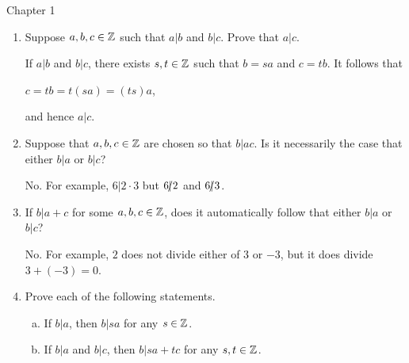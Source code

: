 \documentclass[11pt,fleqn,dvipsnames,usenames]{article}
\renewcommand{\headrulewidth}{1pt}
\begin{document}
\fancyhead[L]{\course}
\fancyhead[R]{\term}
\renewcommand{\headrulewidth}{0.4pt}

{\huge Chapter 1}
\vsp

\begin{enumerate}
\item Suppose $a,b,c\in\mathbb{Z}$ such that $a|b$ and $b|c$.  Prove that $a|c$.
\vsp

\solution If $a|b$ and $b|c$, there exists $s,t\in\mathbb{Z}$ such that $b = sa$ and $c = tb$.  It follows that
\begin{center}
$c = tb = t(sa) = (ts)a$,
\end{center}
and hence $a|c$.

\item Suppose that $a,b,c\in\mathbb{Z}$ are chosen so that $b|ac$.  Is it necessarily the case that either $b|a$ or $b|c$?
\vsp

\solution No.  For example, $6|2\cdot 3$ but $6|\kern-0.9ex{/} 2$ and $6|\kern-0.9ex{/} 3$.

\item If $b|a+c$ for some $a,b,c\in \mathbb{Z}$, does it automatically follow that either $b|a$ or $b|c$?
\vsp

\solution No.  For example, $2$ does not divide either of $3$ or $-3$, but it does divide $3 + (-3) = 0$.
\vsp

\item Prove each of the following statements.
\begin{enumerate}[(a)]
\item If $b|a$, then $b|sa$ for any $s\in\mathbb{Z}$.
\item If $b|a$ and $b|c$, then $b|sa+tc$ for any $s,t\in\mathbb{Z}$.
\end{enumerate}
\vsp



\end{enumerate}
\end{document}
